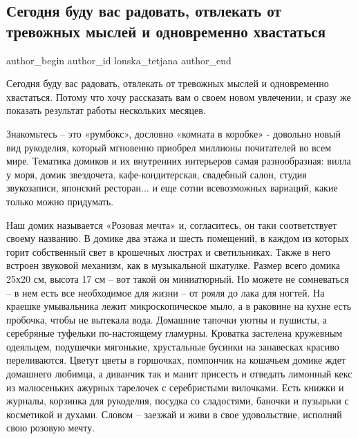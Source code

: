  
 
 
 
 
 
\subsection{Сегодня буду вас радовать, отвлекать от тревожных мыслей и одновременно хвастаться}
\label{sec:01_06_2022.fb.lonska_tetjana.1.rumboks}
 
\ifcmt
 author_begin
   author_id lonska_tetjana
 author_end
\fi

Сегодня буду вас радовать, отвлекать от тревожных мыслей и одновременно
хвастаться.  Потому что хочу рассказать вам о своем новом увлечении, и сразу же
показать результат работы нескольких месяцев. 

Знакомьтесь – это «румбокс», дословно «комната в коробке» - довольно новый
вид рукоделия, который мгновенно приобрел миллионы почитателей во всем
мире. Тематика домиков и их внутренних интерьеров  самая разнообразная:
вилла у моря, домик звездочета, кафе-кондитерская, свадебный салон, студия
звукозаписи, японский ресторан... и еще сотни всевозможных вариаций, какие
только можно придумать.

Наш домик называется «Розовая мечта» и, согласитесь, он таки
соответствует своему названию. В домике два этажа и шесть помещений, в
каждом из которых горит собственный свет в крошечных люстрах и
светильниках. Также в него встроен звуковой механизм, как в музыкальной
шкатулке. Размер всего домика 25х20 см, высота 17 см – вот такой он
миниатюрный. Но можете не сомневаться – в нем есть все необходимое для
жизни – от рояля до лака для ногтей. На краешке умывальника лежит
микроскопическое мыло, а в раковине на кухне есть пробочка, чтобы не
вытекала вода.  Домашние тапочки уютны и пушисты, а серебряные туфельки
по-настоящему гламурны. Кроватка застелена кружевным одеяльцем, подушечки
мягонькие, хрустальные бусинки на занавесках красиво переливаются. Цветут
цветы в горшочках, помпончик на кошачьем домике ждет домашнего любимца, а
диванчик так и манит присесть и отведать лимонный кекс из малюсеньких
ажурных тарелочек с серебристыми вилочками.  Есть книжки и журналы,
корзинка для рукоделия, посудка со сладостями, баночки и пузырьки с
косметикой и духами. Словом – заезжай и живи в свое удовольствие,
исполняй свою розовую мечту.

